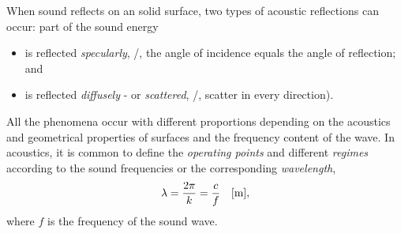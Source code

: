 When sound reflects on an solid surface, two types of acoustic reflections can occur: part of the sound energy
\begin{itemize}
    \item is reflected \textit{specularly}, \ie/, the angle of incidence equals the angle of reflection; and
    \item is reflected \textit{diffusely} - or \textit{scattered}, \ie/, scatter in every direction).
\end{itemize}

All the phenomena occur with different proportions depending on the acoustics and geometrical properties of surfaces and the frequency content of the wave.
In acoustics, it is common to define the \textit{operating points} and different \textit{regimes}
according to the sound frequencies or the corresponding \textit{wavelength},
\begin{equation}
    \lambda = \frac{2 \pi}{k} = \frac{c}{f} \quad [\si{\metre}]
    ,
\end{equation}
where $f$ is the frequency of the sound wave.


